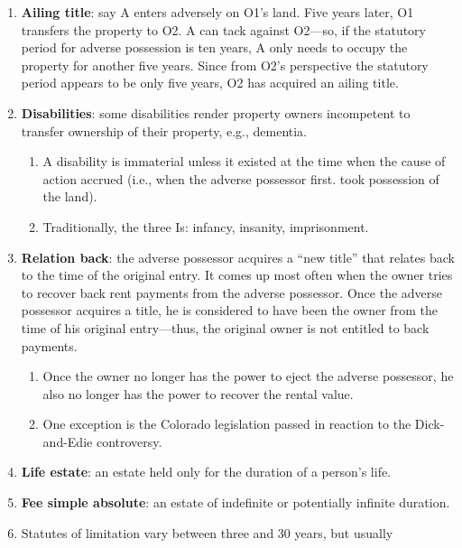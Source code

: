 \begin{enumerate}
\begin{enumerate}
    \end{enumerate}
    \item \textbf{Ailing title}: say A enters adversely on O1's land. Five 
    years later, O1 transfers the property to O2. A can tack against O2---so, if 
    the statutory period for adverse possession is ten years, A only needs to 
    occupy the property for another five years. Since from O2's perspective the 
    statutory period appears to be only five years, O2 has acquired an ailing 
    title.
    \item \textbf{Disabilities}: some disabilities render property owners 
    incompetent to transfer ownership of their property, e.g., dementia.
    \begin{enumerate}
        \item A disability is immaterial unless it existed at the time when 
        the cause of action accrued (i.e., when the adverse possessor first.
        took possession of the land).
        \item Traditionally, the three Is: infancy, insanity, imprisonment.
    \end{enumerate}
    \item \textbf{Relation back}: the adverse possessor acquires a ``new title'' 
    that relates back to the time of the original entry. It comes up most often 
    when the owner tries to recover back rent payments from the adverse 
    possessor. Once the adverse possessor acquires a title, he is considered to 
    have been the owner from the time of his original entry---thus, the original 
    owner is not entitled to back payments.
    \begin{enumerate}
        \item Once the owner no longer has the power to eject the adverse 
        possessor, he also no longer has the power to recover the rental value.
        \item One exception is the Colorado legislation passed in reaction to 
        the Dick-and-Edie controversy.
    \end{enumerate}
    \item \textbf{Life estate}: an estate held only for the duration of a 
    person's life.
    \item \textbf{Fee simple absolute}: an estate of indefinite or potentially 
    infinite duration.
    \item Statutes of limitation vary between three and 30 years, but usually 

\end{enumerate}
